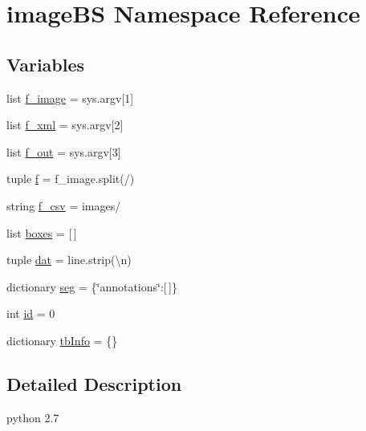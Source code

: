 \hypertarget{namespaceimage_b_s}{}\section{image\+B\+S Namespace Reference}
\label{namespaceimage_b_s}
\subsection*{Variables}
\begin{DoxyCompactItemize}
\item 
list \hyperlink{namespaceimage_b_s_a7df157a2caeb768f9b81b6c8e4968944}{f\+\_\+image} = sys.\+argv\mbox{[}1\mbox{]}
\item 
list \hyperlink{namespaceimage_b_s_ab38ba6a5205abed7791bba0d27249f26}{f\+\_\+xml} = sys.\+argv\mbox{[}2\mbox{]}
\item 
list \hyperlink{namespaceimage_b_s_a709f8577b5d6213a8008234dc9f65789}{f\+\_\+out} = sys.\+argv\mbox{[}3\mbox{]}
\item 
tuple \hyperlink{namespaceimage_b_s_ae7044b26e5021b569cdeecfa22694286}{f} = f\+\_\+image.\+split(\textquotesingle{}/\textquotesingle{})
\item 
string \hyperlink{namespaceimage_b_s_a0d0c30a1aa5ea8a8e481c9c231b21752}{f\+\_\+csv} = \textquotesingle{}images/\textquotesingle{}
\item 
list \hyperlink{namespaceimage_b_s_a02d92cf43a826b0c9189a1ff0d529a0c}{boxes} = \mbox{[}$\,$\mbox{]}
\item 
tuple \hyperlink{namespaceimage_b_s_a4accd4b8363e02d8f839dcf485a38897}{dat} = line.\+strip(\textquotesingle{}\textbackslash{}n\textquotesingle{})
\item 
dictionary \hyperlink{namespaceimage_b_s_aa1b3cff79bc269fd970cb3cc994855a3}{seg} = \{\char`\"{}annotations\char`\"{}\+:\mbox{[}$\,$\mbox{]}\}
\item 
int \hyperlink{namespaceimage_b_s_a26bd6c671dd10d4d3b2fb1a1765a1df5}{id} = 0
\item 
dictionary \hyperlink{namespaceimage_b_s_a3ba54cc10f742919e009dff42143c281}{tb\+Info} = \{\}
\end{DoxyCompactItemize}


\subsection{Detailed Description}
\begin{DoxyVerb}python 2.7 \end{DoxyVerb}
 

